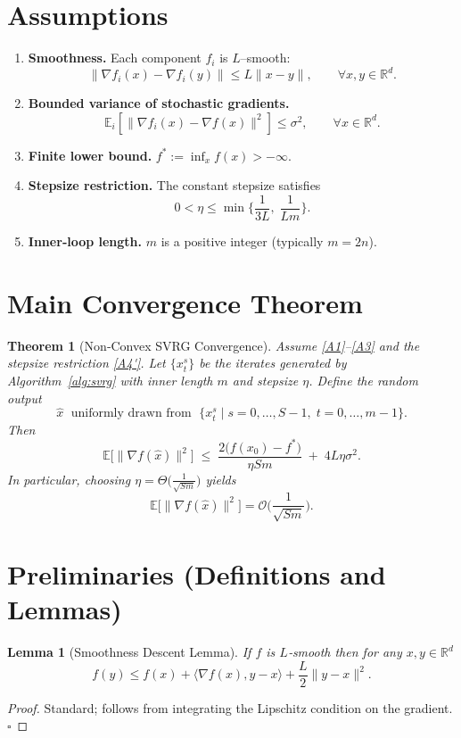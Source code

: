 \documentclass{article}
\newtheorem{theorem}{Theorem}
\newtheorem{lemma}{Lemma}
\begin{document}
\section*{Assumptions}
\begin{enumerate}[label=(A\arabic*)]
\item \textbf{Smoothness.} Each component $f_i$ is $L$–smooth:
\[
\|\nabla f_i(x)-\nabla f_i(y)\|\le L\|x-y\|,\qquad\forall x,y\in\mathbb{R}^{d}.
\]
\item \textbf{Bounded variance of stochastic gradients.}
\[
\mathbb{E}_{i}\!\left[\big\|\nabla f_i(x)-\nabla f(x)\big\|^{2}\right]\le\sigma^{2},
\qquad\forall x\in\mathbb{R}^{d}.
\]
\item \textbf{Finite lower bound.} $f^{*}:=\inf_{x}f(x)>-\infty$.
\item \textbf{Stepsize restriction.} The constant stepsize satisfies
\[
0<\eta\le \min\Big\{\frac{1}{3L},\;\frac{1}{Lm}\Big\}.
\tag{A4'}
\]
\item \textbf{Inner‑loop length.} $m$ is a positive integer (typically $m=2n$).  
\end{enumerate}

\section*{Main Convergence Theorem}
\begin{theorem}[Non‑Convex SVRG Convergence]\label{thm:svrg}
Assume \ref{A1}–\ref{A3} and the stepsize restriction \eqref{A4'}.  
Let $\{x_{t}^{s}\}$ be the iterates generated by Algorithm~\ref{alg:svrg} with inner length $m$ and stepsize $\eta$.  
Define the random output
\[
\hat{x}\;\text{ uniformly drawn from }\;\Big\{x_{t}^{s}\mid s=0,\dots,S-1,\;t=0,\dots,m-1\Big\}.
\]
Then
\[
\mathbb{E}\!\big[\|\nabla f(\hat{x})\|^{2}\big]
    \;\le\;
    \frac{2\big(f(x_{0})-f^{*}\big)}{\eta Sm}
    \;+\;
    4L\eta\sigma^{2}.
\tag{2}
\]
In particular, choosing $\eta = \Theta\!\big(\frac{1}{\sqrt{Sm}}\big)$ yields
\[
\mathbb{E}\!\big[\|\nabla f(\hat{x})\|^{2}\big]=\mathcal{O}\!\Big(\frac{1}{\sqrt{Sm}}\Big).
\]
\end{theorem}

\section*{Preliminaries (Definitions and Lemmas)}
\begin{lemma}[Smoothness Descent Lemma]\label{lem:smooth}
If $f$ is $L$‑smooth then for any $x,y\in\mathbb{R}^{d}$
\[
f(y)\le f(x)+\langle\nabla f(x),y-x\rangle+\frac{L}{2}\|y-x\|^{2}.
\tag{3}
\]
\end{lemma}
\begin{proof}
Standard; follows from integrating the Lipschitz condition on the gradient. \hfill $\square$
\end{proof}
\end{document}
